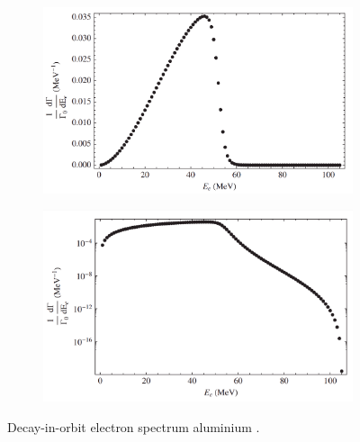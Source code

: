 \begin{figure}[!h]
     \begin{subfigure}[b]{0.4\linewidth}
         \centering
         \includegraphics[scale = 0.18]{figures/png/Screenshot_20240222_175415.png}
         \label{fig:linearscalemichel}
     \end{subfigure}
     \begin{subfigure}[b]{0.7\linewidth}
         \centering
         \includegraphics[scale = 0.18]{figures/png/Screenshot_20240222_175446.png}
         \label{fig:logscalemichel}
     \end{subfigure}
     \caption[Decay-in-orbit spectrum.]{
       Decay-in-orbit electron spectrum  aluminium 
          \cite{PhysRevD.84.013006}.}
        \label{fig:michel}
\end{figure}

